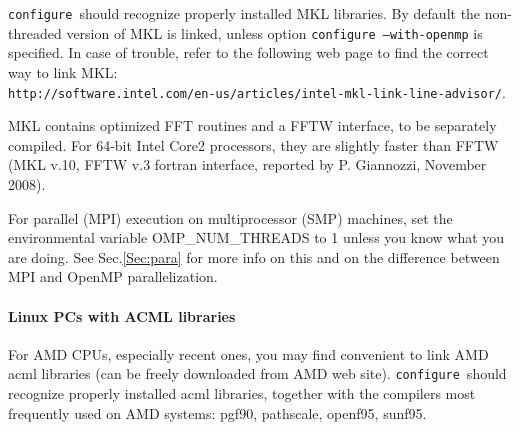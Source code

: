 \documentclass[12pt,a4paper]{article}
\def\configure{\texttt{configure}}
\begin{document}
\configure\ should recognize properly installed MKL libraries.
By default the non-threaded version of MKL is linked, unless option
\texttt{configure --with-openmp} is specified. In case of trouble,
refer to the following web page to find the correct way to link MKL:\\
\texttt{http://software.intel.com/en-us/articles/intel-mkl-link-line-advisor/}.

MKL contains optimized FFT routines and a FFTW interface, to be separately
compiled. For 64-bit Intel Core2 processors, they are slightly faster than 
FFTW (MKL v.10, FFTW v.3 fortran interface, reported by P. Giannozzi,
November 2008). 

For parallel (MPI) execution on multiprocessor (SMP) machines, set the
environmental variable OMP\_NUM\_THREADS to 1 unless you know what you 
are doing. See Sec.\ref{Sec:para} for more info on this
and on the difference between MPI and OpenMP parallelization. 

\paragraph{Linux PCs with ACML libraries}
For AMD CPUs, especially recent ones, you may find convenient to 
link AMD acml libraries (can be freely downloaded from AMD web site). 
\configure\ should recognize properly installed acml libraries,
together with the compilers most frequently used on AMD systems:
pgf90, pathscale, openf95, sunf95.
\end{document}
